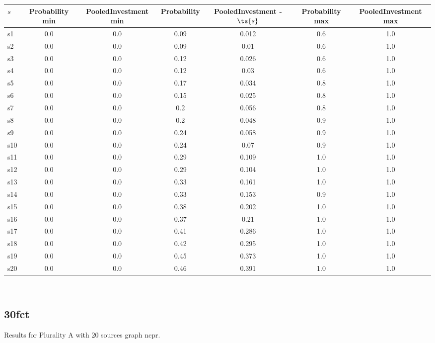\documentclass{article}
\begin{document}
\noindent\begin{tabular}{|l|c|c|c|c|c|c|}
\hline
$s$& Probability min & PooledInvestment min & Probability & PooledInvestment - $\ts{s}$ & Probability max & PooledInvestment max\\
\hline
s1 &0.0 & 0.0 & 0.09 & 0.012 & 0.6 & 1.0\\
\hline
s2 &0.0 & 0.0 & 0.09 & 0.01 & 0.6 & 1.0\\
\hline
s3 &0.0 & 0.0 & 0.12 & 0.026 & 0.6 & 1.0\\
\hline
s4 &0.0 & 0.0 & 0.12 & 0.03 & 0.6 & 1.0\\
\hline
s5 &0.0 & 0.0 & 0.17 & 0.034 & 0.8 & 1.0\\
\hline
s6 &0.0 & 0.0 & 0.15 & 0.025 & 0.8 & 1.0\\
\hline
s7 &0.0 & 0.0 & 0.2 & 0.056 & 0.8 & 1.0\\
\hline
s8 &0.0 & 0.0 & 0.2 & 0.048 & 0.9 & 1.0\\
\hline
s9 &0.0 & 0.0 & 0.24 & 0.058 & 0.9 & 1.0\\
\hline
s10 &0.0 & 0.0 & 0.24 & 0.07 & 0.9 & 1.0\\
\hline
s11 &0.0 & 0.0 & 0.29 & 0.109 & 1.0 & 1.0\\
\hline
s12 &0.0 & 0.0 & 0.29 & 0.104 & 1.0 & 1.0\\
\hline
s13 &0.0 & 0.0 & 0.33 & 0.161 & 1.0 & 1.0\\
\hline
s14 &0.0 & 0.0 & 0.33 & 0.153 & 0.9 & 1.0\\
\hline
s15 &0.0 & 0.0 & 0.38 & 0.202 & 1.0 & 1.0\\
\hline
s16 &0.0 & 0.0 & 0.37 & 0.21 & 1.0 & 1.0\\
\hline
s17 &0.0 & 0.0 & 0.41 & 0.286 & 1.0 & 1.0\\
\hline
s18 &0.0 & 0.0 & 0.42 & 0.295 & 1.0 & 1.0\\
\hline
s19 &0.0 & 0.0 & 0.45 & 0.373 & 1.0 & 1.0\\
\hline
s20 &0.0 & 0.0 & 0.46 & 0.391 & 1.0 & 1.0\\
\hline
\end{tabular}\\

\newpage

\subsection{30fct}

\noindent Results for Plurality A with 20 sources graph ncpr.
\end{document}
